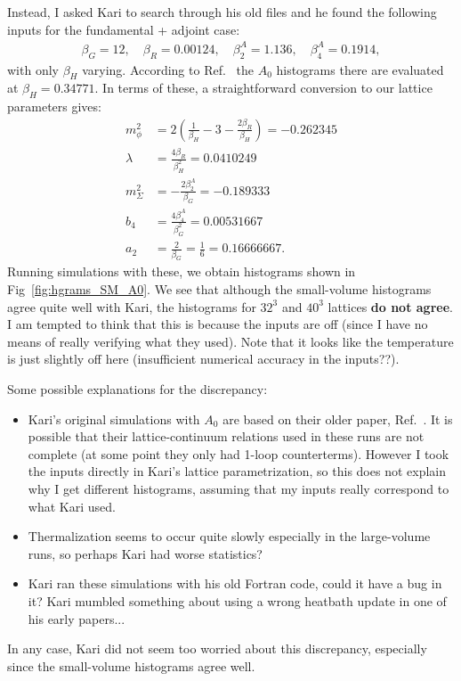 \documentclass[11pt,a4paper]{article}
\begin{document}
Instead, I asked Kari to search through his old files and he found the following inputs for the fundamental + adjoint case:
\begin{align}
\beta_G = 12, \quad \beta_R = 0.00124, \quad \beta^A_2 = 1.136, \quad \beta^A_4 = 0.1914, 
\end{align}
with only $\beta_H$ varying. According to Ref.~\cite{Kajantie:1995kf} the $A_0$ histograms there are evaluated at $\beta_H = 0.34771$. In terms of these, a straightforward conversion to our lattice parameters gives: 
\begin{align}
m^2_\phi &= 2\left( \frac{1}{\beta_H} - 3 - \frac{2\beta_R}{\beta_H}\right) = -0.262345\\
\lambda &= \frac{4\beta_R}{\beta_H^2} = 0.0410249 \\
m^2_\Sigma &= -\frac{2\beta_2^A}{\beta_G} = -0.189333 \\
b_4 &= \frac{4\beta_4^A}{\beta_G^2} = 0.00531667 \\
a_2 &= \frac{2}{\beta_G} = \frac16 = 0.16666667.
\end{align}
Running simulations with these, we obtain histograms shown in Fig~\ref{fig:hgrams_SM_A0}. We see that although the small-volume histograms agree quite well with Kari, the histograms for $32^3$ and $40^3$ lattices \textbf{do not agree}. I am tempted to think that this is because the inputs are off (since I have no means of really verifying what they used). Note that it looks like the temperature is just slightly off here (insufficient numerical accuracy in the inputs??).

Some possible explanations for the discrepancy: 
\begin{itemize}

	\item Kari's original simulations with $A_0$ are based on their older paper, Ref.~\cite{Farakos:1994kj}. It is possible that their lattice-continuum relations used in these runs are not complete (at some point they only had 1-loop counterterms). However I took the inputs directly in Kari's lattice parametrization, so this does not explain why I get different histograms, assuming that my inputs really correspond to what Kari used. 

	\item Thermalization seems to occur quite slowly especially in the large-volume runs, so perhaps Kari had worse statistics? 

	\item Kari ran these simulations with his old Fortran code, could it have a bug in it? Kari mumbled something about using a wrong heatbath update in one of his early papers...

\end{itemize}
In any case, Kari did not seem  too worried about this discrepancy, especially since the small-volume histograms agree well. 
\end{document}
